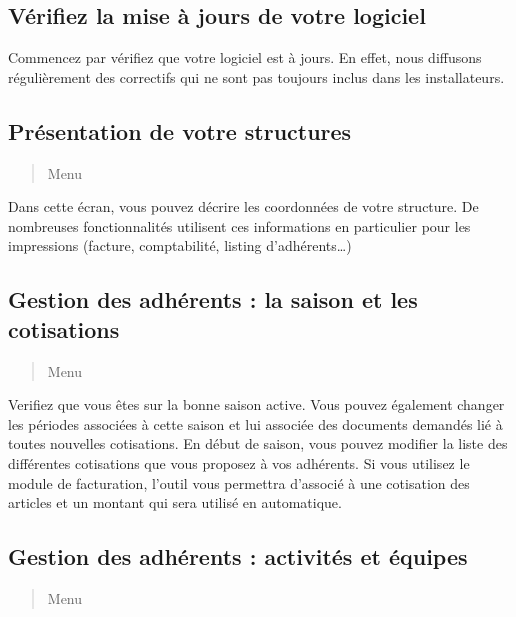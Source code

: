 \documentclass[a4paper,10pt,oneside,french]{sphinxmanual}
\begin{document}
\subsection{Vérifiez la mise à jours de votre logiciel}
\label{\detokenize{asso/first_step:verifiez-la-mise-a-jours-de-votre-logiciel}}
Commencez par vérifiez que votre logiciel est à jours.
En effet, nous diffusons régulièrement des correctifs qui ne sont pas toujours inclus dans les installateurs.


\subsection{Présentation de votre structures}
\label{\detokenize{asso/first_step:presentation-de-votre-structures}}\begin{quote}

Menu 
\end{quote}

Dans cette écran, vous pouvez décrire les coordonnées de votre structure.
De nombreuses fonctionnalités utilisent ces informations en particulier pour les impressions (facture, comptabilité, listing d’adhérents…)


\subsection{Gestion des adhérents : la saison et les cotisations}
\label{\detokenize{asso/first_step:gestion-des-adherents-la-saison-et-les-cotisations}}\begin{quote}

Menu 
\end{quote}

Verifiez que vous êtes sur la bonne saison active. Vous pouvez également changer les périodes associées à cette saison et lui associée des documents demandés lié à toutes nouvelles cotisations.
En début de saison, vous pouvez modifier la liste des différentes cotisations que vous proposez à vos adhérents.
Si vous utilisez le module de facturation, l’outil vous permettra d’associé à une cotisation des articles et un montant qui sera utilisé en automatique.


\subsection{Gestion des adhérents : activités et équipes}
\label{\detokenize{asso/first_step:gestion-des-adherents-activites-et-equipes}}\begin{quote}

Menu 
\end{quote}
\end{document}
